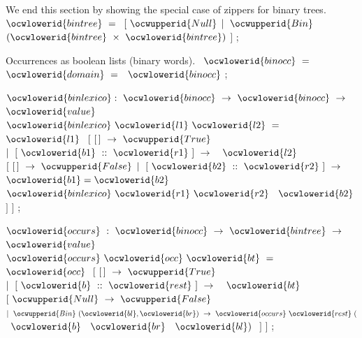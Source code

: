 \documentclass[12pt]{article}
\begin{document}
We end this section by showing the special case of zippers for
binary trees.
\label{../ML/bintree.ml:0}%
\label{../ML/bintree.ml:684}%
\ocwbegincode{}\ocwindent{0.00em}
~$\ocwlowerid{bintree}~=~$\ocweol
\ocwindent{1.00em}
$[~\ocwupperid{Null}$\ocweol
\ocwindent{1.00em}
$\mid{}~\ocwupperid{Bin}~$~$(\ocwlowerid{bintree}~\times{}~\ocwlowerid{bintree})$\ocweol
\ocwindent{1.00em}
$]$\ocweol
\ocwindent{0.00em}
;\medskip

\ocwendcode{}\ocwindent{0.00em}
Occurrences as boolean lists (binary words). 
\ocweol
\label{../ML/bintree.ml:798}%
\medskip
\ocwbegincode{}\ocwindent{0.00em}
~$\ocwlowerid{binocc}~=~$~\ocweol
\ocwindent{0.00em}
~$\ocwlowerid{domain}~=~$~$\ocwlowerid{binocc}$\ocweol
\ocwindent{0.00em}
;\medskip

\ocwendcode{}\ocwindent{0.00em}
\ocwbegindcode{}$\ocwlowerid{binlexico}:~\ocwlowerid{binocc}~\rightarrow{}~\ocwlowerid{binocc}~\rightarrow{}~$\ocwenddcode{} 
\ocweol
\label{../ML/bintree.ml:894}%
\medskip
\ocwbegincode{}\ocwindent{0.00em}
$\ocwlowerid{value}~$~$\ocwlowerid{binlexico}~\ocwlowerid{l1}~\ocwlowerid{l2}~=~$~$\ocwlowerid{l1}~$\ocweol
\ocwindent{1.00em}
$[~[\,]~\rightarrow{}~\ocwupperid{True}$\ocweol
\ocwindent{1.00em}
$\mid{}~[~\ocwlowerid{b1}~::~\ocwlowerid{r1}~]~\rightarrow{}~$~$\ocwlowerid{l2}~$~\ocweol
\ocwindent{3.00em}
$[~[\,]~\rightarrow{}~\ocwupperid{False}$\ocweol
\ocwindent{3.00em}
$\mid{}~[~\ocwlowerid{b2}~::~\ocwlowerid{r2}~]~\rightarrow{}~$~$\ocwlowerid{b1}=\ocwlowerid{b2}~$~$\ocwlowerid{binlexico}~\ocwlowerid{r1}~\ocwlowerid{r2}~$~$\ocwlowerid{b2}$\ocweol
\ocwindent{3.00em}
$]$\ocweol
\ocwindent{1.00em}
$]$\ocweol
\ocwindent{0.00em}
;\medskip

\ocwendcode{}\ocwindent{0.00em}
\ocwbegindcode{}$\ocwlowerid{occurs}~:~\ocwlowerid{binocc}~\rightarrow{}~\ocwlowerid{bintree}~\rightarrow{}~$\ocwenddcode{} 
\ocweol
\label{../ML/bintree.ml:1127}%
\medskip
\ocwbegincode{}\ocwindent{0.00em}
$\ocwlowerid{value}~$~$\ocwlowerid{occurs}~\ocwlowerid{occ}~\ocwlowerid{bt}~=~$~$\ocwlowerid{occ}~$\ocweol
\ocwindent{1.00em}
$[~[\,]~\rightarrow{}~\ocwupperid{True}$\ocweol
\ocwindent{1.00em}
$\mid{}~[~\ocwlowerid{b}~::~\ocwlowerid{rest}~]~\rightarrow{}~$~$\ocwlowerid{bt}~$\ocweol
\ocwindent{2.50em}
$[~\ocwupperid{Null}~\rightarrow{}~\ocwupperid{False}$\ocweol
\ocwindent{2.50em}
$\mid{}~\ocwupperid{Bin}~(\ocwlowerid{bl},\ocwlowerid{br})~\rightarrow{}~\ocwlowerid{occurs}~\ocwlowerid{rest}~($~$\ocwlowerid{b}~$~$\ocwlowerid{br}~$~$\ocwlowerid{bl})~$\ocweol
\ocwindent{2.50em}
$]$\ocweol
\ocwindent{1.00em}
$]$\ocweol
\ocwindent{0.00em}
;\medskip
\end{document}
